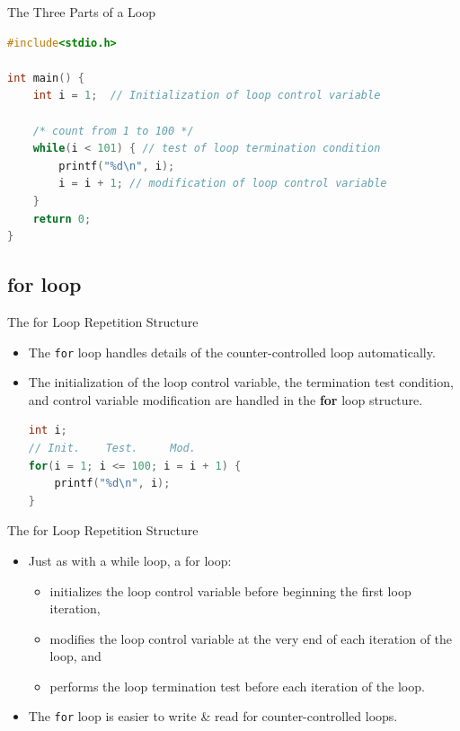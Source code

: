 \documentclass[graphics]{beamer}
\begin{document}
\begin{frame}[fragile]{The Three Parts of a Loop}
    \begin{lstlisting}[language=C,basicstyle=\footnotesize,keywordstyle=\color{blue},commentstyle=\color{green},showstringspaces=false,stringstyle=\color{red}]
#include<stdio.h>

int main() {
    int i = 1;  // Initialization of loop control variable
    
    /* count from 1 to 100 */
    while(i < 101) { // test of loop termination condition
        printf("%d\n", i);
        i = i + 1; // modification of loop control variable
    }
    return 0;
}
    \end{lstlisting}
\end{frame}

\subsection{for loop}
\begin{frame}[fragile]{The for Loop Repetition Structure}
    \begin{itemize}
        \item The \texttt{for} loop handles details of the counter-controlled loop automatically.
        \item The initialization of the loop control variable, the termination test condition, and control variable modification are handled in the \textbf{for} loop structure.
\begin{lstlisting}[language=C,basicstyle=\footnotesize,keywordstyle=\color{blue},commentstyle=\color{green},showstringspaces=false,stringstyle=\color{red}]
int i;
// Init.    Test.     Mod.
for(i = 1; i <= 100; i = i + 1) {
    printf("%d\n", i);
}
\end{lstlisting}
    \end{itemize}
\end{frame}

\begin{frame}{The for Loop Repetition Structure}
    \begin{itemize}
        \item Just as with a while loop, a for loop:
        \begin{itemize}
            \item initializes the loop control variable before beginning the first loop iteration,
            \item modifies the loop control variable at the very end of each iteration of the loop, and
            \item performs the loop termination test before each iteration of the loop.
        \end{itemize}
        \item The \texttt{for} loop is easier to write \& read for counter-controlled loops.
    \end{itemize}
\end{frame}
\end{document}
